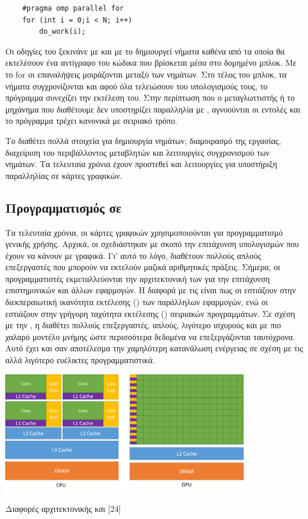 \begin{verbatim}
    #pragma omp parallel for
    for (int i = 0;i < N; i++)
        do_work(i);
\end{verbatim}


Οι οδηγίες του  ξεκινάνε με  και με το  δημιουργεί νήματα καθένα από τα οποία θα εκτελέσουν ένα αντίγραφο του κώδικα που βρίσκεται μέσα στο δομημένο μπλοκ. Με το for οι επαναλήψεις μοιράζονται μεταξύ των νημάτων. Στο τέλος του μπλοκ, τα νήματα συγχρονίζονται και αφού όλα τελειώσουν του υπολογισμούς τους, το πρόγραμμα συνεχίζει την εκτέλεση του. Στην περίπτωση που ο μεταγλωττιστής ή το μηχάνημα που διαθέτουμε δεν υποστηρίζει παραλληλία με , αγνοούνται οι εντολές  και το πρόγραμμα τρέχει κανονικά με σειριακό τρόπο.

Το  διαθέτει πολλά στοιχεία για δημιουργία νημάτων, διαμοιρασμό της εργασίας, διαχείριση του περιβάλλοντος μεταβλητών και λειτουργίες συγχρονισμού των νημάτων. Τα τελευταία χρόνια έχουν προστεθεί και λειτουργίες για υποστήριξη παραλληλίας σε κάρτες γραφικών.

\subsection{Προγραμματισμός σε }

Τα τελευταία χρόνια, οι κάρτες γραφικών χρησιμοποιούνται για προγραμματισμό γενικής χρήσης. Αρχικά, οι  σχεδιάστηκαν με σκοπό την επιτάχυνση υπολογισμών που έχουν να κάνουν με γραφικά. Γι’ αυτό το λόγο, διαθέτουν πολλούς απλούς επεξεργαστές που μπορούν να εκτελούν μαζικά αριθμητικές πράξεις. Σήμερα, οι προγραμματιστές εκμεταλλεύονται την αρχιτεκτονική των  για την επιτάχυνση επιστημονικών και άλλων εφαρμογών. 
Η διαφορά με τις  είναι πως οι  εστιάζουν στην διεκπεραιωτική ικανότητα εκτέλεσης () των παράλληλων εφαρμογών, ενώ οι  εστιάζουν στην γρήγορη ταχύτητα εκτέλεσης () σειριακών προγραμμάτων. Σε σχέση με την , η  διαθέτει πολλούς επεξεργαστές, απλούς, λιγότερο ισχυρούς και με πιο χαλαρό μοντέλο μνήμης ώστε περισσότερα δεδομένα να επεξεργάζονται ταυτόχρονα. Αυτό έχει και σαν αποτέλεσμα την χαμηλότερη κατανάλωση ενέργειας σε σχέση με τις  αλλά λιγότερο ευέλικτες προγραμματιστικά. 
 
\begin{Illustration}[!h] 
	\centering
	\includegraphics[width=0.8\textwidth]{images/image046.png} 
	\caption{Διαφορές αρχιτεκτονικής  και  [24]}
	\label{image-3.3}
\end{Illustration}

